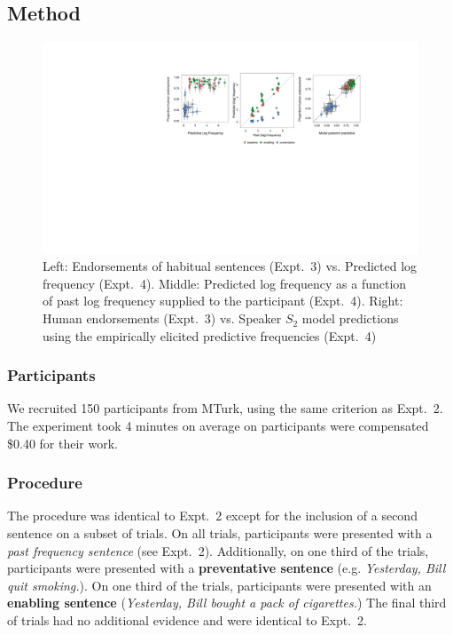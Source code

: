 \documentclass[10pt,letterpaper]{article}
\begin{document}
\subsection{Method}
\begin{figure}[t]
\centering
  \includegraphics[width=\textwidth]{expt3-4-scatters.pdf}
  \caption{Left: Endorsements of habitual sentences (Expt.~3) vs. Predicted log frequency (Expt.~4). Middle: Predicted log frequency as a function of past log frequency supplied to the participant (Expt.~4). Right: Human endorsements (Expt.~3) vs. Speaker $S_2$ model predictions using the empirically elicited predictive frequencies (Expt.~4)}
  \label{fig:tj3}
\end{figure}

\subsubsection{Participants} 

We recruited 150 participants from MTurk, using the same criterion as Expt.~2.
The experiment took 4 minutes on average on participants were compensated \$0.40 for their work.

\subsubsection{Procedure}

The procedure was identical to Expt.~2 except for the inclusion of a second sentence on a subset of trials. 
On all trials, participants were presented with a \emph{past frequency sentence} (see Expt.~2).
Additionally, on one third of the trials, participants were presented with a \textbf{preventative sentence} (e.g. \emph{Yesterday, Bill quit smoking.}). %
On one third of the trials, participants were presented with an \textbf{enabling sentence} (\emph{Yesterday, Bill bought a pack of cigarettes.}) %
The final third of trials had no additional evidence and were identical to Expt.~2. 
\end{document}
